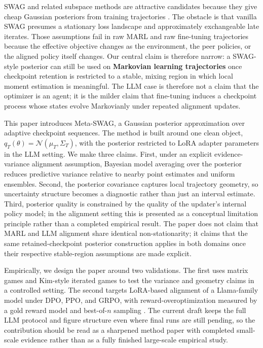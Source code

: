 \documentclass[10pt]{article}
\theoremstyle{plain}
\theoremstyle{definition}
\theoremstyle{remark}
\begin{document}
SWAG and related subspace methods are attractive candidates because they give cheap Gaussian posteriors from training trajectories \citep{maddox2019swag}. The obstacle is that vanilla SWAG presumes a stationary loss landscape and approximately exchangeable late iterates. Those assumptions fail in raw MARL and raw fine-tuning trajectories because the effective objective changes as the environment, the peer policies, or the aligned policy itself changes. Our central claim is therefore narrow: a SWAG-style posterior can still be used on \textbf{Markovian learning trajectories} once checkpoint retention is restricted to a stable, mixing region in which local moment estimation is meaningful. The LLM case is therefore not a claim that the optimizer is an agent; it is the milder claim that fine-tuning induces a checkpoint process whose states evolve Markovianly under repeated alignment updates.

This paper introduces Meta-SWAG, a Gaussian posterior approximation over adaptive checkpoint sequences. The method is built around one clean object, $q_T(\theta)=\mathcal{N}(\mu_T,\Sigma_T)$, with the posterior restricted to LoRA adapter parameters in the LLM setting. We make three claims. First, under an explicit evidence-variance alignment assumption, Bayesian model averaging over the posterior reduces predictive variance relative to nearby point estimates and uniform ensembles. Second, the posterior covariance captures local trajectory geometry, so uncertainty structure becomes a diagnostic rather than just an interval estimate. Third, posterior quality is constrained by the quality of the updater's internal policy model; in the alignment setting this is presented as a conceptual limitation principle rather than a completed empirical result. The paper does not claim that MARL and LLM alignment share identical non-stationarity; it claims that the same retained-checkpoint posterior construction applies in both domains once their respective stable-region assumptions are made explicit.

Empirically, we design the paper around two validations. The first uses matrix games and Kim-style iterated games to test the variance and geometry claims in a controlled setting. The second targets LoRA-based alignment of a Llama-family model under DPO, PPO, and GRPO, with reward-overoptimization measured by a gold reward model and best-of-$n$ sampling \citep{gao2023overoptimization,rafailov2024daa}. The current draft keeps the full LLM protocol and figure structure even where final runs are still pending, so the contribution should be read as a sharpened method paper with completed small-scale evidence rather than as a fully finished large-scale empirical study.
\end{document}
